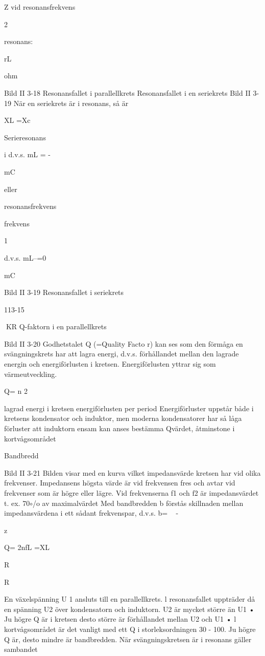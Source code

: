 {{Z vid
resonansfrekvens

2

resonans:

rL

ohm

Bild II 3-18 Resonansfallet i parallellkrets
Resonansfallet i en seriekrets
Bild II 3-19
När en seriekrets är i resonans, så är

XL =Xc

Serieresonans

i
d.v.s. mL = -

mC

eller

resonansfrekvens

frekvens

1

d.v.s. mL--=0

mC

Bild II 3-19 Resonansfallet i seriekrets

113-15

KR
Q-faktorn i en parallellkrets

Bild II 3-20
Godhetstalet Q (=Quality Facto r) kan ses
som den förmåga en svängningskrets har att
lagra energi, d.v.s. förhållandet mellan den
lagrade energin och energiförlusten i kretsen. Energiförlusten yttrar sig som värmeutveckling.

Q= n
2

lagrad energi i kretsen
energiförlusten per period
Energiförluster uppstår både i kretsens
kondensator och induktor, men moderna
kondensatorer har så låga förluster att
induktorn ensam kan anses bestämma Qvärdet, åtminstone i kortvågsområdet

Bandbredd

Bild II 3-21
Bilden visar med en kurva vilket impedansvärde kretsen har vid olika frekvenser.
Impedansens högsta värde är vid frekvensen fres och avtar vid frekvenser som är högre
eller lägre. Vid frekvenserna f1 och f2 är
impedansvärdet t. ex. 70\(\circ\)/o av maximalvärdet
Med bandbredden b förstås skillnaden mellan impedansvärdena i ett sådant frekvenspar, d.v.s. b= ~ - ~

z

Q= 2nfL =XL

R

R

En växelspänning U 1 ansluts till en
parallellkrets. l resonansfallet uppträder då
en spänning U2 över kondensatorn och
induktorn.
U2 är mycket större än U1 • Ju högre Q är
i kretsen desto större är förhållandet mellan
U2 och U1 •
l kortvågsområdet är det vanligt med ett
Q i storleksordningen 30 - 100.
Ju högre Q är, desto mindre är bandbredden.
När svängningskretsen är i resonans gäller sambandet

}}
